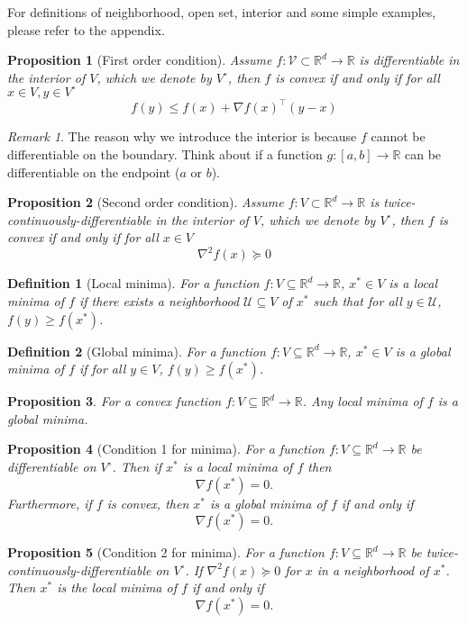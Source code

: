 \documentclass{article}
\newtheorem{definition}{Definition}
\newtheorem{proposition}{Proposition}
\newcommand{\R}{\mathbb{R}}
\DeclareMathOperator*{\1}{\mathbbm{1}}
\theoremstyle{definition}
\theoremstyle{remark}
\newtheorem{remark}{Remark}
\newcommand{\cU}{\mathcal{U}}
\newcommand{\cV}{\mathcal{V}}
\begin{document}
  \color{red}For definitions of neighborhood, open set, interior and some simple examples, please refer to the appendix.\color{black}
  
  \begin{proposition}[First order condition]
    Assume $f:\cV\subset \R^d\to \R$ is differentiable in the interior of $V$, which we denote by $V^\circ$, then $f$ is convex if and only if for all $x\in V, y\in V^\circ$
    \begin{equation*}
      f(y)\le f(x)+\nabla f(x)^\top (y-x)
    \end{equation*}
  \end{proposition}
  \begin{remark}
    The reason why we introduce the interior is because $f$ cannot be differentiable on the boundary. Think about if a function $g:[a,b]\to\R$ can be differentiable on the endpoint ($a$ or $b$).
  \end{remark}
  \begin{proposition}[Second order condition]
    Assume $f:V\subset \R^d\to \R$ is twice-continuously-differentiable in the interior of $V$, which we denote by $V^\circ$, then $f$ is convex if and only if for all $x\in V$
    \begin{equation*}
      \nabla^2f(x)\succeq 0
    \end{equation*}
  \end{proposition}
  \begin{definition}[Local minima]
    For a function $f:V\subseteq \R^d \to \R$, $x^*\in V$ is a local minima of $f$ if there exists a neighborhood $\cU\subseteq V$ of $x^*$ such that for all $y\in \cU$, $f(y)\ge f(x^*)$.
  \end{definition}
  \begin{definition}[Global minima]
    For a function $f:V\subseteq \R^d \to \R$, $x^*\in V$ is a global minima of $f$ if for all $y\in V$, $f(y)\ge f(x^*)$.
  \end{definition}
  \begin{proposition}
    For a convex function $f:V\subseteq \R^d \to \R$. Any local minima of $f$ is a global minima.
  \end{proposition}
  \begin{proposition}[Condition 1 for minima]
    For a function $f:V\subseteq \R^d \to \R$ be differentiable on $V^\circ$. Then if $x^*$ is a local minima of $f$ then 
    \begin{equation*}
      \nabla f(x^*)=0.
    \end{equation*}
    Furthermore, if $f$ is convex, then $x^*$ is a global minima of $f$ if and only if 
    \begin{equation*}
      \nabla f(x^*)=0.
    \end{equation*}
  \end{proposition}
  \begin{proposition}[Condition 2 for minima]
    For a function $f:V\subseteq \R^d \to \R$ be twice-continuously-differentiable on $V^\circ$. If $\nabla^2 f(x)\succeq 0$ for $x$ in a neighborhood of $x^*$. Then $x^*$ is the local minima of $f$ if and only if 
    \begin{equation*}
      \nabla f(x^*)=0.
    \end{equation*}
  \end{proposition}
\end{document}

